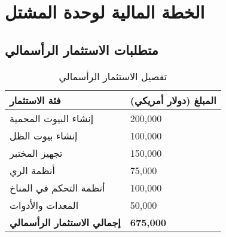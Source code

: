 \section{الخطة المالية لوحدة المشتل}

\subsection{متطلبات الاستثمار الرأسمالي}

\begin{table}[h]
\centering
\begin{tabular}{p{}p{}}
\hline
\textbf{فئة الاستثمار} & \textbf{المبلغ (دولار أمريكي)} \\
\hline
إنشاء البيوت المحمية & 200,000 \\
إنشاء بيوت الظل & 100,000 \\
تجهيز المختبر & 150,000 \\
أنظمة الري & 75,000 \\
أنظمة التحكم في المناخ & 100,000 \\
المعدات والأدوات & 50,000 \\
\hline
\textbf{إجمالي الاستثمار الرأسمالي} & \textbf{675,000} \\
\hline
\end{tabular}
\caption{تفصيل الاستثمار الرأسمالي}
\end{table}

